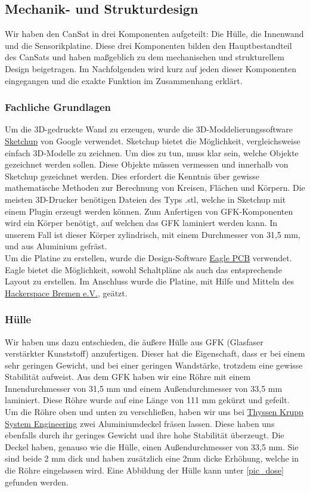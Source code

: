 \subsection{Mechanik- und Strukturdesign}

Wir haben den CanSat in drei Komponenten aufgeteilt: Die Hülle, die Innenwand und die Sensorikplatine. Diese drei Komponenten bilden den Hauptbestandteil des CanSats und haben maßgeblich zu dem mechanischen und strukturellem Design beigetragen. Im Nachfolgenden wird kurz auf jeden dieser Komponenten eingegangen und die exakte Funktion im Zusammenhang erklärt.

\subsubsection{Fachliche Grundlagen}
Um die 3D-gedruckte Wand zu erzeugen, wurde die 3D-Moddelierungssoftware \href{http://www.sketchup.com/de} {Sketchup} von Google verwendet. Sketchup bietet die Möglichkeit, vergleichsweise einfach 3D-Modelle zu zeichnen. Um dies zu tun, muss klar sein, welche Objekte gezeichnet werden sollen. Diese Objekte müssen vermessen und innerhalb von Sketchup gezeichnet werden. Dies erfordert die Kenntnis über gewisse mathematische Methoden zur Berechnung von Kreisen, Flächen und Körpern. Die meisten 3D-Drucker benötigen Dateien des Typs .stl, welche in Sketchup mit einem Plugin erzeugt werden können.
Zum Anfertigen von GFK-Komponenten wird ein Körper benötigt, auf welchen das GFK laminiert werden kann. In unserem Fall ist dieser Körper zylindrisch, mit einem Durchmesser von 31,5 mm, und aus Aluminium gefräst. \\
Um die Platine zu erstellen, wurde die Design-Software \href{http://www.cadsoft.de/eagle-pcb-design-software/} {Eagle PCB} verwendet. Eagle bietet die Möglichkeit, sowohl Schaltpläne als auch das entsprechende Layout zu erstellen. Im Anschluss wurde die Platine, mit Hilfe und Mitteln des \href{https://www.hackerspace-bremen.de/}{Hackerspace Bremen e.V.}, geätzt.

\subsubsection{Hülle}
Wir haben uns dazu entschieden, die äußere Hülle aus GFK (Glasfaser verstärkter Kunststoff) anzufertigen. Dieser hat die Eigenschaft, dass er bei einem sehr geringen Gewicht, und bei einer geringen Wandstärke, trotzdem eine gewisse Stabilität aufweist. Aus dem GFK haben wir eine Röhre mit einem Innendurchmesser von 31,5 mm und einem Außendurchmesser von 33,5 mm laminiert. Diese Röhre wurde auf eine Länge von 111 mm gekürzt und gefeilt. Um die Röhre oben und unten zu verschließen, haben wir uns bei \href{http://www.thyssenkrupp-system-engineering.com/de/home.html}{Thyssen Krupp System Engineering} zwei Aluminiumdeckel fräsen lassen. Diese haben uns ebenfalls durch ihr geringes Gewicht und ihre hohe Stabilität überzeugt. Die Deckel haben, genauso wie die Hülle, einen Außendurchmesser von 33,5 mm. Sie sind beide 2 mm dick und haben zusätzlich eine 2mm dicke Erhöhung, welche in die Röhre eingelassen wird. Eine Abbildung der Hülle kann unter \ref{pic_dose} gefunden werden.

